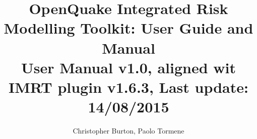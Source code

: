 \documentclass{article}
\begin{document}
\title{OpenQuake Integrated Risk Modelling Toolkit: User Guide and Manual \\
       User Manual v1.0, aligned wit IMRT plugin v1.6.3, Last update: 14/08/2015}
\author{Christopher Burton, Paolo Tormene}
\date{}

\maketitle
\tableofcontents











\end{document}
